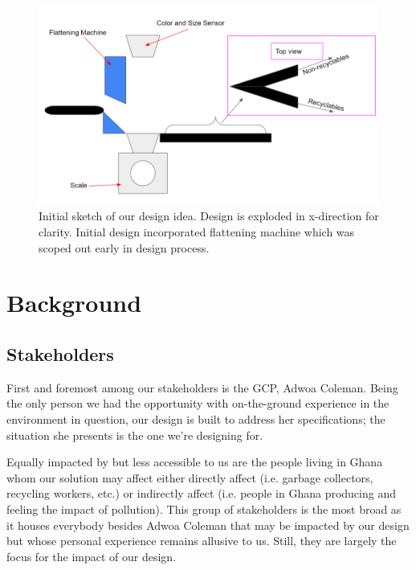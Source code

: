 \documentclass[12pt]{article}
\begin{document}
\begin{multicols*}{2}
            
            \begin{figure}[H]
                \centering\includegraphics[width=\linewidth]{InitialConcept.png}
                \captionsetup{width=\linewidth}
                \caption{Initial sketch of our design idea. Design is exploded in x-direction for clarity. Initial design incorporated flattening machine which was scoped out early in design process.}
                \label{fig:initial}
            \end{figure}

    \section{Background}
        \subsection{Stakeholders}
            First and foremost among our stakeholders is the GCP, Adwoa Coleman. Being the only person we had the opportunity with on-the-ground experience in the environment in question, our design is built to address her specifications; the situation she presents is the one we're designing for.
            
            Equally impacted by but less accessible to us are the people living in Ghana whom our solution may affect either directly affect (i.e. garbage collectors, recycling workers, etc.) or indirectly affect (i.e. people in Ghana producing and feeling the impact of pollution). This group of stakeholders is the most broad as it houses everybody besides Adwoa Coleman that may be impacted by our design but whose personal experience remains allusive to us. Still, they are largely the focus for the impact of our design.
            

\end{multicols*}
\end{document}
